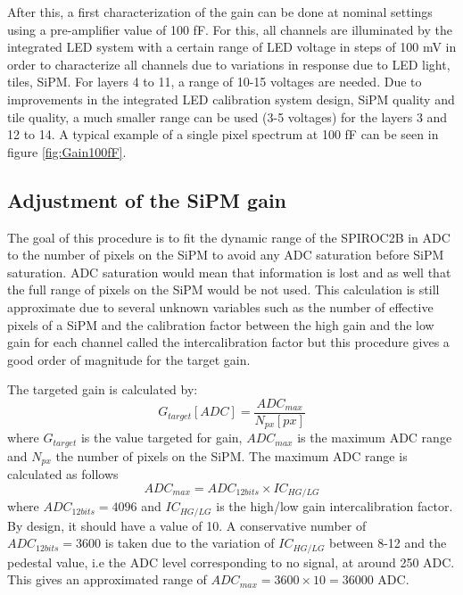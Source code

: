 After this, a first characterization of the gain can be done at nominal settings using a pre-amplifier value of 100 fF. For this, all channels are illuminated by the integrated LED system with a certain range of LED voltage in steps of 100 mV in order to characterize all channels due to variations in response due to LED light, tiles, SiPM. For layers 4 to 11, a range of 10-15 voltages are needed. Due to improvements in the integrated LED calibration system design, SiPM quality and tile quality, a much smaller range can be used (3-5 voltages) for the layers 3 and 12 to 14. A typical example of a single pixel spectrum at 100 fF can be seen in figure \ref{fig:Gain100fF}.

\subsection{Adjustment of the SiPM gain}
\label{sec:AdjustGain}

The goal of this procedure is to fit the dynamic range of the SPIROC2B in ADC to the number of pixels on the SiPM to avoid any ADC saturation before SiPM saturation. ADC saturation would mean that information is lost and as well that the full range of pixels on the SiPM would be not used. This calculation is still approximate due to several unknown variables such as the number of effective pixels of a SiPM and the calibration factor between the high gain and the low gain for each channel called the intercalibration factor but this procedure gives a good order of magnitude for the target gain.

The targeted gain is calculated by:
\begin{equation}
  G_{target} [ADC] = \frac{ADC_{max}}{N_{px} [px]} \label{eq:GainTarget}
\end{equation}
where $G_{target}$ is the value targeted for gain, $ADC_{max}$ is the maximum ADC range and $N_{px}$ the number of pixels on the SiPM. The maximum ADC range is calculated as follows
\begin{equation}
  ADC_{max} = ADC_{12 bits} \times IC_{HG/LG}
\end{equation}
where $ADC_{12 bits} = 4096$ and $IC_{HG/LG}$ is the high/low gain intercalibration factor. By design, it should have a value of 10. A conservative number of $ADC_{12 bits} = 3600$ is taken due to the variation of $IC_{HG/LG}$ between 8-12 and the pedestal value, i.e the ADC level corresponding to no signal, at around 250 ADC. This gives an approximated range of $ADC_{max} = 3600 \times 10 = 36 000$ ADC.

